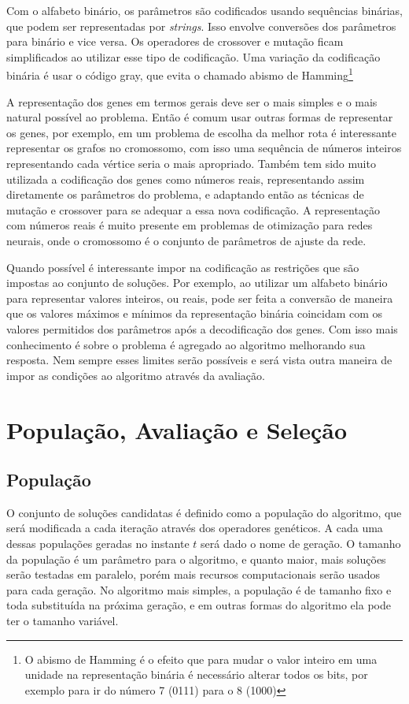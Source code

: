 Com o alfabeto binário, os parâmetros são codificados usando sequências binárias, que podem ser representadas por \textit{strings}. Isso envolve conversões dos parâmetros para binário e vice versa. Os operadores de crossover e mutação ficam simplificados ao utilizar esse tipo de codificação. Uma variação da codificação binária é usar o código gray, que evita o chamado abismo de Hamming\footnote{O abismo de Hamming é o efeito que para mudar o valor inteiro em uma unidade na representação binária é necessário alterar todos os bits, por exemplo para ir do número 7 (0111) para o 8 (1000)} 

A representação dos genes em termos gerais deve ser o mais simples e o mais natural possível ao problema. Então é comum usar outras formas de representar os genes, por exemplo, em um problema de escolha da melhor rota é interessante representar os grafos no cromossomo, com isso uma sequência de números inteiros representando cada vértice seria o mais apropriado. Também tem sido muito utilizada a codificação dos genes como números reais, representando assim diretamente os parâmetros do problema, e adaptando então as técnicas de mutação e crossover para se adequar a essa nova codificação. A representação com números reais é muito presente em problemas de otimização para redes neurais, onde o cromossomo é o conjunto de parâmetros de ajuste da rede.

Quando possível é interessante impor na codificação as restrições que são impostas ao conjunto de soluções. Por exemplo, ao utilizar um alfabeto binário para representar valores inteiros, ou reais, pode ser feita a conversão de maneira que os valores máximos e mínimos da representação binária coincidam com os valores permitidos dos parâmetros após a decodificação dos genes. Com isso mais conhecimento é sobre o problema é agregado ao algoritmo melhorando sua resposta. Nem sempre esses limites serão possíveis e será vista outra maneira de impor as condições ao algoritmo através da avaliação.

\section{População, Avaliação e Seleção}
\label{sec:avaliacao}
\subsection{População}
O conjunto de soluções candidatas é definido como a população do algoritmo, que será modificada a cada iteração através dos operadores genéticos. A cada uma dessas populações geradas no instante \(t\) será dado o nome de geração. O tamanho da população é um parâmetro para o algoritmo, e quanto maior, mais soluções serão testadas em paralelo, porém mais recursos computacionais serão usados para cada geração. No algoritmo mais simples, a população é de tamanho fixo e toda substituída na próxima geração, e em outras formas do algoritmo ela pode ter o tamanho variável.

